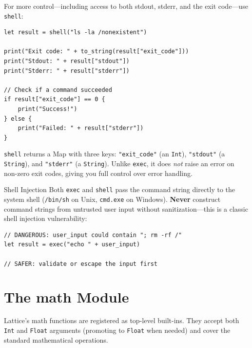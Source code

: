 For more control---including access to both stdout, stderr, and the exit
code---use \lstinline|shell|:

\begin{lstlisting}[language=Lattice, caption={Running commands with shell for full control}]
let result = shell("ls -la /nonexistent")

print("Exit code: " + to_string(result["exit_code"]))
print("Stdout: " + result["stdout"])
print("Stderr: " + result["stderr"])

// Check if a command succeeded
if result["exit_code"] == 0 {
    print("Success!")
} else {
    print("Failed: " + result["stderr"])
}
\end{lstlisting}

\lstinline|shell| returns a Map with three keys: \lstinline|"exit_code"|
(an \lstinline|Int|), \lstinline|"stdout"| (a \lstinline|String|), and
\lstinline|"stderr"| (a \lstinline|String|). Unlike \lstinline|exec|, it
does \emph{not} raise an error on non-zero exit codes, giving you full
control over error handling.

\begin{warnbox}{Shell Injection}
Both \lstinline|exec| and \lstinline|shell| pass the command string directly
to the system shell (\texttt{/bin/sh} on Unix, \texttt{cmd.exe} on Windows).
\textbf{Never} construct command strings from untrusted user input without
sanitization---this is a classic shell injection vulnerability:
\begin{lstlisting}[language=Lattice]
// DANGEROUS: user_input could contain "; rm -rf /"
let result = exec("echo " + user_input)

// SAFER: validate or escape the input first
\end{lstlisting}
\end{warnbox}

\section{The math Module}\label{sec:math-module}


Lattice's math functions are registered as top-level built-ins. They accept
both \lstinline|Int| and \lstinline|Float| arguments (promoting to
\lstinline|Float| when needed) and cover the standard mathematical operations.

